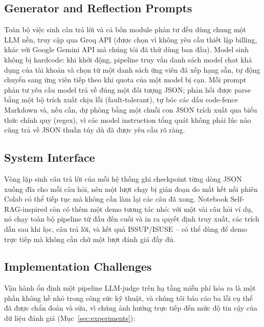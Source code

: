\documentclass[11pt]{article}
\begin{document}
\subsection{Generator and Reflection Prompts}
Toàn bộ việc sinh câu trả lời và cả bốn module phản tư đều dùng chung một LLM nền, truy cập qua Groq API \citep{groq2024} (được chọn vì không yêu cầu thiết lập billing, khác với Google Gemini API mà chúng tôi đã thử dùng ban đầu). Model sinh không bị hardcode: khi khởi động, pipeline truy vấn danh sách model chat khả dụng của tài khoản và chọn từ một danh sách ứng viên đã xếp hạng sẵn, tự động chuyển sang ứng viên tiếp theo khi quota của một model bị cạn. Mỗi prompt phản tư yêu cầu model trả về đúng một đối tượng JSON; phản hồi được parse bằng một bộ trích xuất chịu lỗi (fault-tolerant), tự bóc các dấu code-fence Markdown và, nếu cần, dự phòng bằng một chuỗi con JSON trích xuất qua biểu thức chính quy (regex), vì các model instruction tổng quát không phải lúc nào cũng trả về JSON thuần túy dù đã được yêu cầu rõ ràng.

\subsection{System Interface}
Vòng lặp sinh câu trả lời của mỗi hệ thống ghi checkpoint từng dòng JSON xuống đĩa cho mỗi câu hỏi, nên một lượt chạy bị gián đoạn do mất kết nối phiên Colab có thể tiếp tục mà không cần làm lại các câu đã xong. Notebook Self-RAG-inspired còn có thêm một demo tương tác nhỏ: với một vài câu hỏi ví dụ, nó chạy toàn bộ pipeline từ đầu đến cuối và in ra quyết định truy xuất, các trích dẫn sau khi lọc, câu trả lời, và kết quả \textsc{ISSUP}/\textsc{ISUSE} -- có thể dùng để demo trực tiếp mà không cần chờ một lượt đánh giá đầy đủ.

\subsection{Implementation Challenges}
\label{sec:challenges}
Vận hành ổn định một pipeline LLM-judge trên hạ tầng miễn phí hóa ra là một phần không hề nhỏ trong công sức kỹ thuật, và chúng tôi báo cáo ba lỗi cụ thể đã được chẩn đoán và sửa, vì chúng ảnh hưởng trực tiếp đến mức độ tin cậy của dữ liệu đánh giá (Mục~\ref{sec:experiments}):
\end{document}
